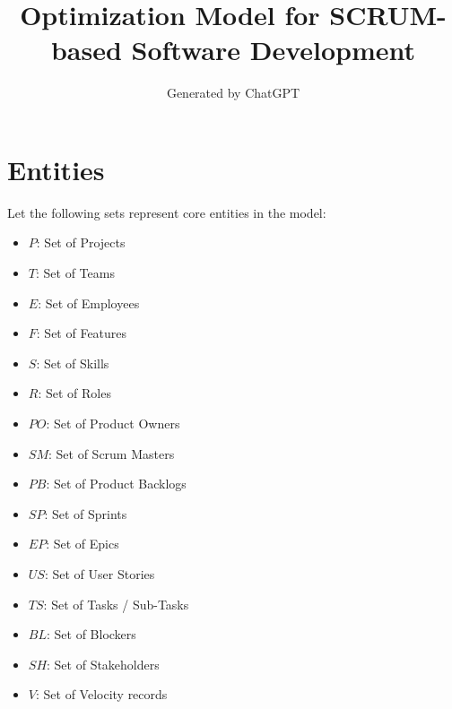 \documentclass{article}
\title{Optimization Model for SCRUM-based Software Development}
\author{Generated by ChatGPT}
\date{}
\begin{document}
\maketitle

\section*{Entities}
Let the following sets represent core entities in the model:
\begin{itemize}
  \item $P$: Set of Projects
  \item $T$: Set of Teams
  \item $E$: Set of Employees
  \item $F$: Set of Features
  \item $S$: Set of Skills
  \item $R$: Set of Roles
  \item $PO$: Set of Product Owners
  \item $SM$: Set of Scrum Masters
  \item $PB$: Set of Product Backlogs
  \item $SP$: Set of Sprints
  \item $EP$: Set of Epics
  \item $US$: Set of User Stories
  \item $TS$: Set of Tasks / Sub-Tasks
  \item $BL$: Set of Blockers
  \item $SH$: Set of Stakeholders
  \item $V$: Set of Velocity records
\end{itemize}
\end{document}
